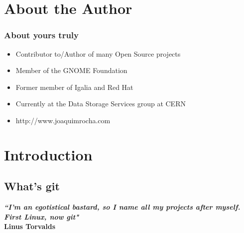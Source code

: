 \section{About the Author}

\begin{frame}
  \frametitle{About yours truly}

  \begin{itemize}
    \item Contributor to/Author of many Open Source projects
    \item Member of the GNOME Foundation
    \item Former member of Igalia and Red Hat
    \item Currently at the Data Storage Services group at CERN
    \item http://www.joaquimrocha.com
  \end{itemize}
\end{frame}


\section{Introduction}


\subsection{What's git}

{
\begin{frame}[plain]
  \begin{center}
    \vspace{140pt}\color{White}
    \textbf{\textit{``I'm an egotistical bastard, so I name all my projects after myself. First Linux, now git"}\\\vspace{10pt}
    Linus Torvalds}
  \end{center}
\end{frame}
}

